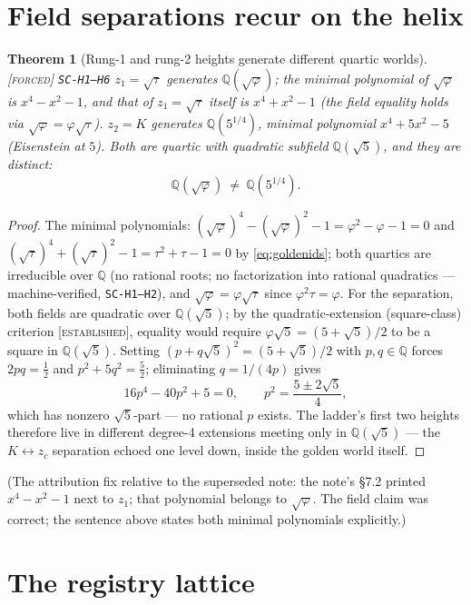 \documentclass[11pt]{article}
\newcommand{\tagF}{\textcolor{cF}{\textsc{[forced]}}}
\newcommand{\tagE}{\textcolor{cE}{\textsc{[established]}}}
\newcommand{\hx}[1]{\textcolor{cC}{\footnotesize\texttt{#1}}}
\newcommand{\Q}{\mathbb{Q}}
\newcommand{\gp}{\varphi}
\theoremstyle{plain}
\newtheorem{theorem}{Theorem}[section]
\theoremstyle{definition}
\theoremstyle{remark}
\begin{document}
\section{Field separations recur on the helix}\label{sec:fields}

\begin{theorem}[Rung-1 and rung-2 heights generate different quartic worlds]\label{thm:fields}\tagF{} \hx{SC-H1--H6}
$z_1=\sqrt\tau$ generates $\Q(\sqrt\gp)$; the minimal polynomial of $\sqrt\gp$ is
$x^4-x^2-1$, and that of $z_1=\sqrt\tau$ itself is $x^4+x^2-1$ (the field equality
holds via $\sqrt\gp=\gp\sqrt\tau$). $z_2=K$ generates $\Q(5^{1/4})$, minimal
polynomial $x^4+5x^2-5$ (Eisenstein at $5$). Both are quartic with quadratic subfield
$\Q(\sqrt5)$, and they are \emph{distinct}:
\[
\Q(\sqrt\gp)\ \neq\ \Q(5^{1/4}).
\]
\end{theorem}

\begin{proof}
The minimal polynomials: $(\sqrt\gp)^4-(\sqrt\gp)^2-1=\gp^2-\gp-1=0$ and
$(\sqrt\tau)^4+(\sqrt\tau)^2-1=\tau^2+\tau-1=0$ by \eqref{eq:goldenids}; both quartics
are irreducible over $\Q$ (no rational roots; no factorization into rational
quadratics --- machine-verified, \hx{SC-H1--H2}), and
$\sqrt\gp=\gp\sqrt\tau$ since $\gp^2\tau=\gp$. For the separation, both fields are
quadratic over $\Q(\sqrt5)$; by the quadratic-extension (square-class) criterion
\tagE{}, equality would require $\gp\sqrt5=(5+\sqrt5)/2$ to be a square in
$\Q(\sqrt5)$. Setting $(p+q\sqrt5)^2=(5+\sqrt5)/2$ with $p,q\in\Q$ forces
$2pq=\tfrac12$ and $p^2+5q^2=\tfrac52$; eliminating $q=1/(4p)$ gives
\[
16p^4-40p^2+5=0,\qquad p^2=\frac{5\pm2\sqrt5}{4},
\]
which has nonzero $\sqrt5$-part --- no rational $p$ exists. The ladder's first two
heights therefore live in different degree-4 extensions meeting only in $\Q(\sqrt5)$
--- the $K\leftrightarrow z_c$ separation echoed one level down, inside the golden
world itself.
\end{proof}

(The attribution fix relative to the superseded note: the note's \S7.2 printed
$x^4-x^2-1$ next to $z_1$; that polynomial belongs to $\sqrt\gp$. The field claim was
correct; the sentence above states both minimal polynomials explicitly.)

\section{The registry lattice}\label{sec:registry}
\end{document}
